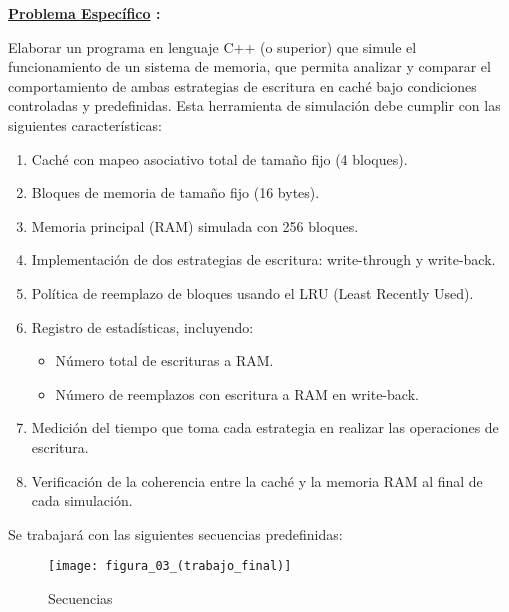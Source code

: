 \documentclass{article}
\begin{document}
\quad


\textbf{ \underline{Problema Específico} :}

\quad

{Elaborar un programa en lenguaje C++ (o superior) que simule el funcionamiento de un sistema de memoria, que permita analizar y comparar el comportamiento de ambas estrategias de escritura en caché bajo condiciones controladas y predefinidas. Esta herramienta de simulación debe cumplir con las siguientes características:}

\begin{enumerate}
    \item Caché con mapeo asociativo total de tamaño fijo (4 bloques).
    \item Bloques de memoria de tamaño fijo (16 bytes).
    \item Memoria principal (RAM) simulada con 256 bloques.
    \item Implementación de dos estrategias de escritura: write-through y write-back.
    \item Política de reemplazo de bloques usando el LRU (Least Recently Used).
    \item Registro de estadísticas, incluyendo:    

     \begin{itemize}
        \item Número total de escrituras a RAM.
        \item Número de reemplazos con escritura a RAM en write-back.
    \end{itemize}

    \item Medición del tiempo que toma cada estrategia en realizar las operaciones de escritura.
    \item Verificación de la coherencia entre la caché y la memoria RAM al final de cada simulación.    
   
\end{enumerate}

\quad
\newpage

{Se trabajará con las siguientes secuencias predefinidas:}

\quad

\begin{figure}[h]
    \centering
    \texttt{[image: figura\_03\_(trabajo\_final)]}
    \caption{Secuencias}
    \label{fig:img1}
\end{figure}


\quad
\end{document}
